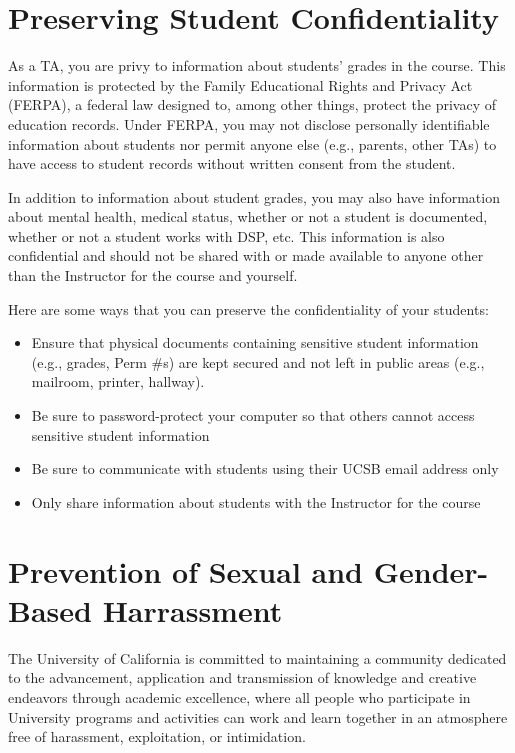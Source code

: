 \documentclass[
  letterpaper,
  DIV=11,
  numbers=noendperiod]{scrreprt}
\begin{document}
\hypertarget{preserving-student-confidentiality}{%
\chapter{Preserving Student
Confidentiality}\label{preserving-student-confidentiality}}

As a TA, you are privy to information about students' grades in the
course. This information is protected by the Family Educational Rights
and Privacy Act (FERPA), a federal law designed to, among other things,
protect the privacy of education records. Under FERPA, you may not
disclose personally identifiable information about students nor permit
anyone else (e.g., parents, other TAs) to have access to student records
without written consent from the student.

In addition to information about student grades, you may also have
information about mental health, medical status, whether or not a
student is documented, whether or not a student works with DSP, etc.
This information is also confidential and should not be shared with or
made available to anyone other than the Instructor for the course and
yourself.

Here are some ways that you can preserve the confidentiality of your
students:

\begin{itemize}
\item
  Ensure that physical documents containing sensitive student
  information (e.g., grades, Perm \#s) are kept secured and not left in
  public areas (e.g., mailroom, printer, hallway).
\item
  Be sure to password-protect your computer so that others cannot access
  sensitive student information
\item
  Be sure to communicate with students using their UCSB email address
  only
\item
  Only share information about students with the Instructor for the
  course
\end{itemize}

\hypertarget{prevention-of-sexual-and-gender-based-harrassment}{%
\chapter{Prevention of Sexual and Gender-Based
Harrassment}\label{prevention-of-sexual-and-gender-based-harrassment}}

The University of California is committed to maintaining a community
dedicated to the advancement, application and transmission of knowledge
and creative endeavors through academic excellence, where all people who
participate in University programs and activities can work and learn
together in an atmosphere free of harassment, exploitation, or
intimidation.
\end{document}
